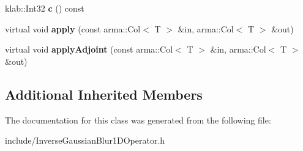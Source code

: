 \begin{DoxyCompactItemize}
\item 
klab\+::\+Int32 {\bfseries c} () const \hypertarget{classkl1p_1_1TInverseGaussianBlur1DOperator_a86c5ba1db9e6d0b5599ff646287e0610}{}\label{classkl1p_1_1TInverseGaussianBlur1DOperator_a86c5ba1db9e6d0b5599ff646287e0610}

\item 
virtual void {\bfseries apply} (const arma\+::\+Col$<$ T $>$ \&in, arma\+::\+Col$<$ T $>$ \&out)\hypertarget{classkl1p_1_1TInverseGaussianBlur1DOperator_aceabd9003080a07224eb46d4ee7a3d60}{}\label{classkl1p_1_1TInverseGaussianBlur1DOperator_aceabd9003080a07224eb46d4ee7a3d60}

\item 
virtual void {\bfseries apply\+Adjoint} (const arma\+::\+Col$<$ T $>$ \&in, arma\+::\+Col$<$ T $>$ \&out)\hypertarget{classkl1p_1_1TInverseGaussianBlur1DOperator_a45cf97c94f5c771a1a2954ac7f744063}{}\label{classkl1p_1_1TInverseGaussianBlur1DOperator_a45cf97c94f5c771a1a2954ac7f744063}

\end{DoxyCompactItemize}
\subsection*{Additional Inherited Members}


The documentation for this class was generated from the following file\+:\begin{DoxyCompactItemize}
\item 
include/Inverse\+Gaussian\+Blur1\+D\+Operator.\+h\end{DoxyCompactItemize}
